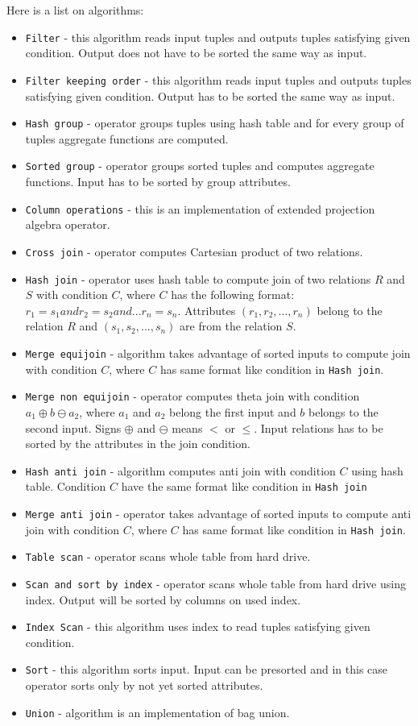 Here is a list on algorithms:
\begin{itemize}
\item \texttt{Filter} - this algorithm reads input tuples and outputs tuples satisfying given condition. Output does not have to be sorted the same way as input.
\item \texttt{Filter~keeping~order} - this algorithm reads input tuples and outputs tuples satisfying given condition. Output has to be sorted the same way as input.
\item \texttt{Hash~group} - operator groups tuples using hash table and for every group of tuples aggregate functions are computed.
\item \texttt{Sorted~group} - operator groups sorted tuples and computes aggregate functions. Input has to be sorted by group attributes.
\item \texttt{Column~operations} - this is an implementation of extended projection algebra operator. 
\item \texttt{Cross~join} - operator computes Cartesian product of two relations.
\item \texttt{Hash~join} - operator uses hash table to compute join of two relations $R$ and $S$ with condition $C$, where $C$ has the following format: $r_1=s_1 and r_2=s_2 and ... r_n=s_n$. Attributes $(r_1,r_2,...,r_n)$ belong to the relation $R$ and $(s_1,s_2,...,s_n)$ are from the relation $S$.
\item \texttt{Merge~equijoin} - algorithm takes advantage of sorted inputs to compute join with condition $C$, where $C$ has same format like condition in \texttt{Hash~join}. 
\item \texttt{Merge~non~equijoin} - operator computes theta join with condition $a_1\oplus b \ominus a_2$, where $a_1$ and $a_2$ belong the first input and $b$ belongs to the second input. Signs $\oplus$ and $\ominus$ means $<$ or $\leq$. Input relations has to be sorted by the attributes in the join condition.
\item \texttt{Hash~anti~join} -  algorithm computes anti join with condition $C$  using hash table. Condition $C$ have the same format like condition in \texttt{Hash~join}
\item \texttt{Merge~anti~join} - operator takes advantage of sorted inputs to compute anti join with condition $C$, where $C$ has same format like condition in \texttt{Hash~join}. 
\item \texttt{Table~scan} - operator scans whole table from hard drive.
\item \texttt{Scan~and~sort~by~index} - operator scans whole table from hard drive using index. Output will be sorted by columns on used index.
\item \texttt{Index~Scan} - this algorithm uses index to read tuples satisfying given condition.
\item \texttt{Sort} - this algorithm sorts input. Input can be presorted and in this case operator sorts only by not yet sorted attributes.
\item \texttt{Union} - algorithm is an implementation of bag union.

\end{itemize}


